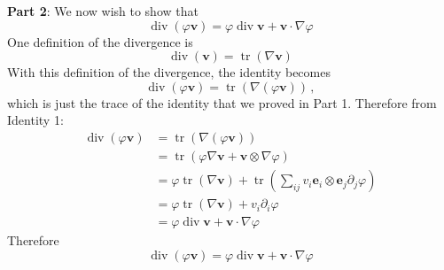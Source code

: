 \documentclass[letterpaper,10pt]{article}
\begin{document}
\textbf{Part 2}:\newline
We now wish to show that
\[
\operatorname{div}(\varphi\mathbf{v})=\varphi\operatorname{div}\mathbf{v}
+\mathbf{v}\cdot\nabla\varphi
\]
One definition of the divergence is
\[
\operatorname{div}(\mathbf{v})=\operatorname{tr}(\nabla\mathbf{v})
\]
With this definition of the divergence, the identity becomes
\[
\operatorname{div}(\varphi\mathbf{v})=\operatorname{tr}(\nabla(\varphi\mathbf{v}
))\,,
\]
which is just the trace of the identity that we proved in Part 1.
Therefore from Identity 1:
\begin{align*}
\operatorname{div}(\varphi\mathbf{v})
&=\operatorname{tr}(\nabla(\varphi\mathbf{v}))\\
&=\operatorname{tr}(\varphi\nabla\mathbf{v}+\mathbf{v}\otimes\nabla\varphi)\\
&=\varphi\operatorname{tr}(\nabla\mathbf{v})+\operatorname{tr}\left(\sum_{ij}
v_i\mathbf{e}_i\otimes\mathbf{e}_j\partial_j\varphi\right)\\
&=\varphi\operatorname{tr}(\nabla\mathbf{v})+v_i\partial_i\varphi\\
&=\varphi\operatorname{div}\mathbf{v}+\mathbf{v}\cdot\nabla\varphi
\end{align*}
Therefore
\[
\operatorname{div}(\varphi\mathbf{v})=\varphi\operatorname{div}\mathbf{v}
+\mathbf{v}\cdot\nabla\varphi
\]
\end{document}
